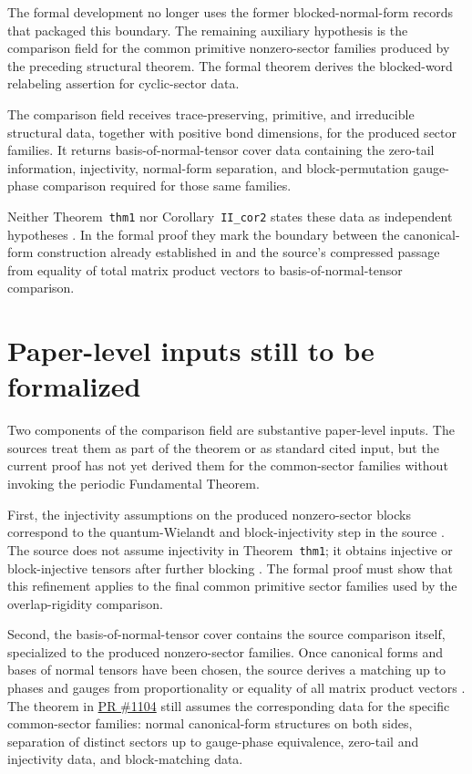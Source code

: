 \documentclass{article}
\begin{document}
The formal development no longer uses the former blocked-normal-form records
that packaged this boundary. The remaining auxiliary hypothesis is the
comparison field for the common primitive nonzero-sector families produced by
the preceding structural theorem. The formal theorem derives the blocked-word
relabeling assertion for cyclic-sector data.

The comparison field receives trace-preserving, primitive, and irreducible
structural data, together with positive bond dimensions, for the produced
sector families. It returns basis-of-normal-tensor cover data containing the
zero-tail information, injectivity, normal-form separation, and
block-permutation gauge-phase comparison required for those same families.

Neither Theorem~\texttt{thm1} nor Corollary~\texttt{II\_cor2} states these data
as independent hypotheses
\cite[lines~347--360]{Cirac2016MPDO_arXiv}. In the formal proof they mark the
boundary between the canonical-form construction already established in
\Lean{} and the source's compressed passage from equality of total matrix
product vectors to basis-of-normal-tensor comparison.

\section{Paper-level inputs still to be formalized}

Two components of the comparison field are substantive paper-level inputs. The
sources treat them as part of the theorem or as standard cited input, but the
current \Lean{} proof has not yet derived them for the common-sector families
without invoking the periodic Fundamental Theorem.

First, the injectivity assumptions on the produced nonzero-sector blocks
correspond to the quantum-Wielandt and block-injectivity step in the source
\cite[lines~317--344]{Cirac2016MPDO_arXiv}. The source does not assume
injectivity in Theorem~\texttt{thm1}; it obtains injective or block-injective
tensors after further blocking
\cite[lines~347--352]{Cirac2016MPDO_arXiv}. The formal proof must show that this
refinement applies to the final common primitive sector families used by the
overlap-rigidity comparison.

Second, the basis-of-normal-tensor cover contains the source comparison itself,
specialized to the produced nonzero-sector families. Once canonical forms and
bases of normal tensors have been chosen, the source derives a matching up to
phases and gauges from proportionality or equality of all matrix product
vectors
\cite[lines~347--360]{Cirac2016MPDO_arXiv}. The theorem in
\href{https://github.com/LionSR/TNLean/pull/1104}{PR \#1104} still assumes the
corresponding data for the specific common-sector families: normal
canonical-form structures on both sides, separation of distinct sectors up to
gauge-phase equivalence, zero-tail and injectivity data, and block-matching
data.
\end{document}

